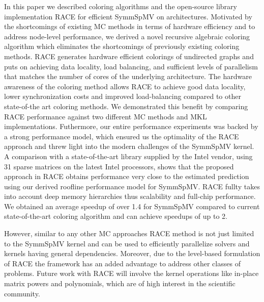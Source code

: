 In this paper we described coloring algorithms and the 
open-source library implementation \acrshort{RACE} for efficient \acrfull{SymmSpMV} on
 architectures. Motivated by the shortcomings of existing \acrshort{MC} methods in  terms of hardware efficiency 
and to address node-level performance, we derived a novel recursive algebraic  coloring algorithm 
which eliminates the shortcomings of previously existing coloring methods.
\acrshort{RACE} generates hardware efficient \DK colorings of undirected graphs and puts 
 on achieving data locality, load balancing, and sufficient levels of parallelism that matches the 
number of cores  of the underlying architecture. The hardware awareness of the 
coloring method allows \acrshort{RACE} to achieve good data locality, lower synchronization costs and 
improved load-balancing compared to other state-of-the art coloring methods. 
We demonstrated this benefit  by comparing  \acrshort{RACE} performance against two different 
\acrshort{MC} methods and \acrshort{MKL} implementations. Futhermore, our entire performance experiments
was backed by a strong performance model,  which ensured us the optimality of the \acrshort{RACE} approach
and threw light into the modern challenges  of the \acrshort{SymmSpMV} kernel.
A comparison with a state-of-the-art library  supplied by the Intel vendor, using 31 sparse matrices 
on the latest Intel  processors, shows that the proposed approach in \acrshort{RACE}
obtains performance very close to the estimated prediction using our derived roofline performance model for 
\acrfull{SymmSpMV}. \acrshort{RACE} fullty takes into account  deep memory hierarchies thus 
 scalability and full-chip performance.
 We obtained an average speedup of over 1.4 for \acrshort{SymmSpMV} compared to current 
state-of-the-art  coloring algorithm and can achieve speedups of up to 2.




However, similar to any other \acrshort{MC} approaches \acrshort{RACE} method 
is not just limited to the \acrshort{SymmSpMV} kernel
and can be used to efficiently parallelize solvers and kernels 
having general \DK dependencies. Moreover, due to the level-based formulation
of \acrshort{RACE} the framework has an added advantage to address 
other classes of problems. Future work with \acrshort{RACE} will involve the
kernel operations like in-place matrix powers and polynomials, which are of 
high interest in the scientific community. 



